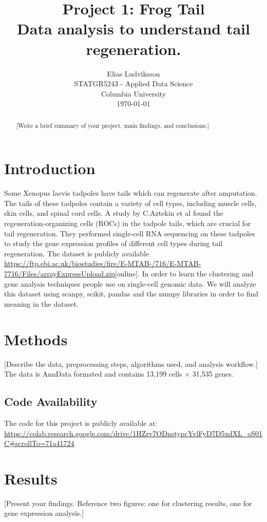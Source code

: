 \documentclass[12pt,letterpaper]{article}
\title{
	\vspace{2cm}
	\textbf{Project 1: Frog Tail}\\
	\vspace{0.5cm}
	\large Data analysis to understand tail regeneration.\\
	\vspace{1cm}
}
\author{
	Elias Ludviksson \\
	STATGR5243 - Applied Data Science \\
	Columbia University \\
	\vspace{0.5cm}
	\today
}
\date{}
\begin{document}
\maketitle
\newpage
\begin{abstract}
	[Write a brief summary of your project, main findings, and conclusions.]
\end{abstract}
\newpage
\setcounter{page}{1}
\tableofcontents
\newpage

\section{Introduction}

Some Xenopus laevis tadpoles have tails which can regenerate after amputation. The tails of these tadpoles contain a variety of cell types, including muscle cells, skin cells, and spinal cord cells.
A study by C.Aztekin et al found the regeneration-organizing cells (ROCs) in the tadpole tails, which are crucial for tail regeneration. They performed single-cell RNA sequencing on these tadpoles to study the gene expression profiles of different cell types during tail regeneration.
The dataset is publicly available \url{https://ftp.ebi.ac.uk/biostudies/fire/E-MTAB-/716/E-MTAB-7716/Files/arrayExpressUpload.zip}[online]. In order to learn the clustering and gene analysis techniques people use on single-cell genomic data. 
We will analyze this dataset using scanpy, scikit, pandas and the numpy libraries in order to find meaning in the dataset.

\section{Methods}
[Describe the data, preprocessing steps, algorithms used, and analysis workflow.]
The data is AnnData formated and contains 13,199 cells × 31,535 genes. 

\subsection{Code Availability}
The code for this project is publicly available at: \\
\url{https://colab.research.google.com/drive/1HZrv7ODnstypcYvlFyD7D5xdXL_oS01C#scrollTo=71a41724}

\section{Results}
[Present your findings. Reference two figures: one for clustering results, one for gene expression analysis.]
\end{document}
